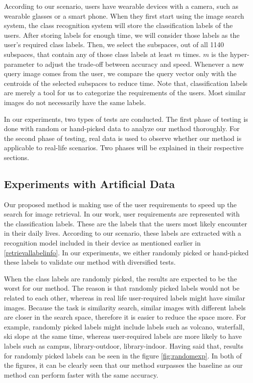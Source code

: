 According to our scenario, users have wearable devices with a camera, such as wearable glasses or a smart phone. 
When they first start using the image search system, the class recognition system will store the classification labels of the users. 
After storing labels for enough time, we will consider those labels as the user's required class labels.
Then, we select the subspaces, out of all 1140 subspaces, that contain any of those class labels at least $m$ times. 
$m$ is the hyper-parameter to adjust the trade-off between accuracy and speed.
Whenever a new query image comes from the user, we compare the query vector only with the centroids of the selected subspaces to reduce time.
Note that, classification labels are merely a tool for us to categorize the requirements of the users.
Most similar images do not necessarily have the same labels.

In our experiments, two types of tests are conducted. 
The first phase of testing is done with random or hand-picked data to analyze our method thoroughly. 
For the second phase of testing, real data is used to observe whether our method is applicable to real-life scenarios. 
Two phases will be explained in their respective sections.

\subsection*{Experiments with Artificial Data}

Our proposed method is making use of the user requirements to speed up the search for image retrieval. 
In our work, user requirements are represented with the classification labels. 
These are the labels that the users most likely encounter in their daily lives. 
According to our scenario, these labels are extracted with a recognition model included in their device as mentioned earlier in \ref{retrievallabelinfo}. 
In our experiments, we either randomly picked or hand-picked these labels to validate our method with diversified tests.

When the class labels are randomly picked, the results are expected to be the worst for our method. 
The reason is that randomly picked labels would not be related to each other, whereas in real life user-required labels might have similar images. 
Because the task is similarity search, similar images with different labels are closer in the search space, therefore it is easier to reduce the space more.
For example, randomly picked labels might include labels such as volcano, waterfall, ski slope at the same time, whereas user-required labels are more likely to have labels such as campus, library-outdoor, library-indoor.
Having said that, results for randomly picked labels can be seen in the figure \ref{fig:randomexp}.
In both of the figures, it can be clearly seen that our method surpasses the baseline as our method can perform faster with the same accuracy.

